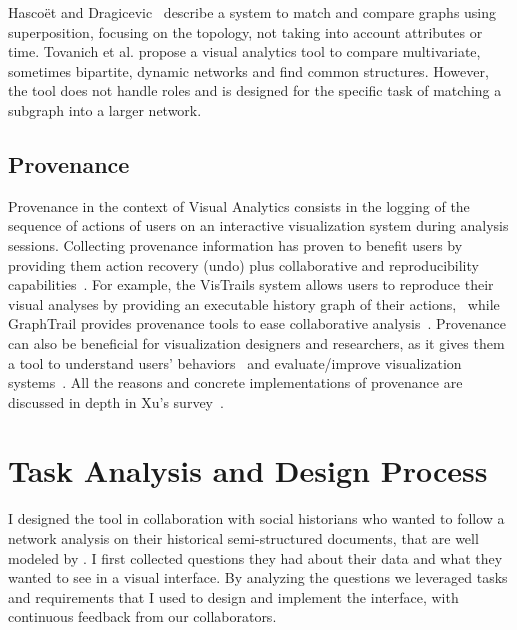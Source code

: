 Hascoët and Dragicevic~\cite{HascoetD12} describe a system to match and compare graphs using superposition, focusing on the topology, not taking into account attributes or time.
Tovanich et al.\cite{tovanichVAST2020Contest2021} propose a visual analytics tool to compare multivariate, sometimes bipartite, dynamic networks and find common structures.
However, the tool does not handle roles and is designed for the specific task of matching a subgraph into a larger network.

\subsection{Provenance}

Provenance in the context of Visual Analytics consists in the logging of the sequence of actions of users on an interactive visualization system during analysis sessions.
Collecting provenance information has proven to benefit users by providing them action recovery (undo) plus collaborative and reproducibility capabilities~\cite{raganCharacterizingProvenanceVisualization2016}.
For example, the VisTrails system allows users to reproduce their visual analyses by providing an executable history graph of their actions,~\cite{callahanVisTrailsVisualizationMeets2006} while GraphTrail provides provenance tools to ease collaborative analysis~\cite{dunneGraphTrailAnalyzingLarge2012}.
Provenance can also be beneficial for visualization designers and researchers, as it gives them a tool to understand users' behaviors~\cite{battleCharacterizingExploratoryVisual2019, borsProvenanceTaskAbstraction2019}
and evaluate/improve visualization systems~\cite{renCharticulatorInteractiveConstruction2019}.
All the reasons and concrete implementations of provenance are discussed in depth in Xu's survey~\cite{xuSurveyAnalysisUser2020}.

\section{Task Analysis and Design Process}\label{sec:combinet-tasks}

I designed the \name tool in collaboration with social historians who wanted to follow a network analysis on their historical semi-structured documents, that are well modeled by \modelplural.
I first collected questions they had about their data and what they wanted to see in a visual interface.
By analyzing the questions we leveraged tasks and requirements that I used to design and implement the interface, with continuous feedback from our collaborators.

